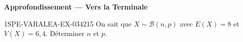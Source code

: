 \begin{center}\textbf{Approfondissement — Vers la Terminale}\end{center}
\begin{exercice}{1SPE-VARALEA-EX-034}{2}{15}
On sait que $X \sim \mathcal{B}(n, p)$ avec $E(X) = 8$ et $V(X) = 6{,}4$. Déterminer $n$ et $p$.
\end{exercice}
